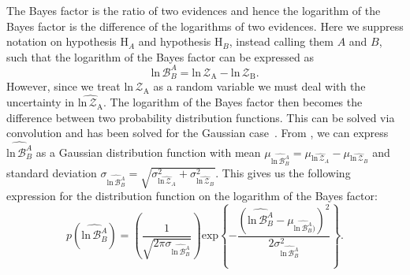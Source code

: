 The Bayes factor is the ratio of two evidences and hence the logarithm of the Bayes factor is the difference of the logarithms of two evidences. Here we suppress notation on hypothesis $\mathrm{H}_A$ and hypothesis $\mathrm{H}_B$, instead calling them $A$ and $B$, such that the logarithm of the Bayes factor can be expressed as
\begin{equation}\label{eqn:log_bayes_factor}
    \mathrm{ln} \, \mathcal{B}^A_B = \mathrm{ln} \, \mathcal{Z}_{\mathrm{A}} - \mathrm{ln} \, \mathcal{Z}_{\mathrm{B}}.
\end{equation}
However, since we treat $\mathrm{ln} \, \mathcal{Z}_{\mathrm{A}}$ as a random variable we must deal with the uncertainty in $\widehat{\mathrm{ln} \, \mathcal{Z}_{\mathrm{A}}}$. The logarithm of the Bayes factor then becomes the difference between two probability distribution functions. This can be solved via convolution and has been solved for the Gaussian case~\citep{bromiley2003products}. From \cite{bromiley2003products}, we can express $\widehat{\mathrm{ln} \, \mathcal{B}^A_B}$ as a Gaussian distribution function with mean $\mu_{\widehat{\mathrm{ln} \, \mathcal{B}^A_B}} = \mu_{\widehat{\mathrm{ln} \, \mathcal{Z}_A}} - \mu_{\widehat{\mathrm{ln} \, \mathcal{Z}_B}}$ and standard deviation $\sigma_{\widehat{\mathrm{ln} \, \mathcal{B}^A_B}} = \sqrt{\sigma_{\widehat{\mathrm{ln} \, \mathcal{Z}_A}}^2 + \sigma_{\widehat{\mathrm{ln} \, \mathcal{Z}_B}}^2 }$. This gives us the following expression for the distribution function on the logarithm of the Bayes factor:
\begin{equation}\label{eqn:p_log_b}
    p(\widehat{\mathrm{ln} \, \mathcal{B}^A_B}) = \left(\frac{1}{\sqrt{2 \pi \sigma_{\widehat{\mathrm{ln} \, \mathcal{B}^A_B}}}} \right) \mathrm{exp} \left \{-\frac{\left(\widehat{\mathrm{ln} \, \mathcal{B}^A_B} - \mu_{\widehat{\mathrm{ln} \, \mathcal{B}^A_B})}\right)^2} {2 \sigma^2_{\widehat{\mathrm{ln} \, \mathcal{B}^A_B}}}  \right\}.
\end{equation}


